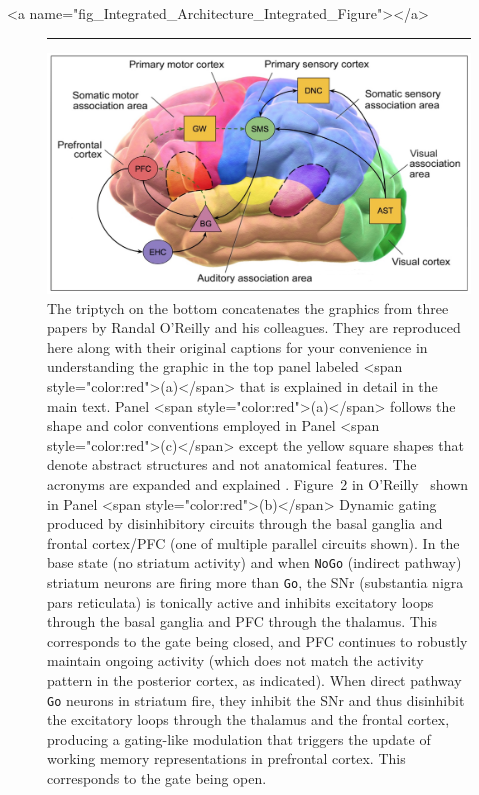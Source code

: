 \rawhtml
<a name="fig_Integrated_Architecture_Integrated_Figure"></a>
\endrawhtml
\begin{figure}
%
  \hrule{}
%
  \begin{center}
    \includegraphics[width=11.0in]{./figures/Integrated_Architecture_Integrated_Figure.png}
  \end{center}
%
  \caption{The triptych on the bottom concatenates the graphics from three papers by Randal O'Reilly and his colleagues. They are reproduced here along with their original captions for your convenience in understanding the graphic in the top panel labeled {\rawhtml<span style="color:red">(a)</span>\endrawhtml} that is explained in detail in the main text. Panel {\rawhtml<span style="color:red">(a)</span>\endrawhtml} follows the shape and color conventions employed in Panel {\rawhtml<span style="color:red">(c)</span>\endrawhtml} except the yellow square shapes that denote abstract structures and not anatomical features. The acronyms are expanded and explained {}.
    Figure~2 in O'Reilly~\cite{OReillySCIENCE-06} shown in Panel {\rawhtml<span style="color:red">(b)</span>\endrawhtml} \emdash{} Dynamic gating produced by disinhibitory circuits through the basal ganglia and frontal cortex/PFC (one of multiple parallel circuits shown).  In the base state (no striatum activity) and when {\tt{NoGo}} (indirect pathway) striatum neurons are firing more than {\tt{Go}}, the SNr (substantia nigra pars reticulata) is tonically active and inhibits excitatory loops through the basal ganglia and PFC through the thalamus. This corresponds to the gate being closed, and PFC continues to robustly maintain ongoing activity (which does not match the activity pattern in the posterior cortex, as indicated). When direct pathway {\tt{Go}} neurons in striatum fire, they inhibit the SNr and thus disinhibit the excitatory loops through the thalamus and the frontal cortex, producing a gating-like modulation that triggers the update of working memory representations in prefrontal cortex. This corresponds to the gate being open.
}
\end{figure}
